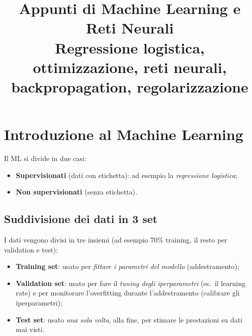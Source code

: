 \documentclass[11pt,a4paper]{article}
\title{\textbf{Appunti di Machine Learning e Reti Neurali}\\[4pt]
\large Regressione logistica, ottimizzazione, reti neurali, backpropagation, regolarizzazione}
\author{}
\date{}
\begin{document}
\maketitle
\tableofcontents
\newpage

\section{Introduzione al Machine Learning}

Il ML si divide in due casi:
\begin{itemize}
  \item \textbf{Supervisionati} (dati con etichetta): ad esempio la \emph{regressione logistica};
  \item \textbf{Non supervisionati} (senza etichetta).
\end{itemize}

\begin{center}
\end{center}

\subsection{Suddivisione dei dati in 3 set}
I dati vengono divisi in tre insiemi (ad esempio 70\% training, il resto per validation e test):
\begin{itemize}
  \item \textbf{Training set}: usato per \emph{fittare i parametri del modello} (addestramento);
  \item \textbf{Validation set}: usato per fare il \emph{tuning degli iperparametri} (es.\ il learning rate) e per monitorare l'overfitting durante l'addestramento (calibrare gli iperparametri);
  \item \textbf{Test set}: usato \emph{una sola volta}, alla fine, per stimare le prestazioni su dati mai visti.
\end{itemize}
\end{document}
